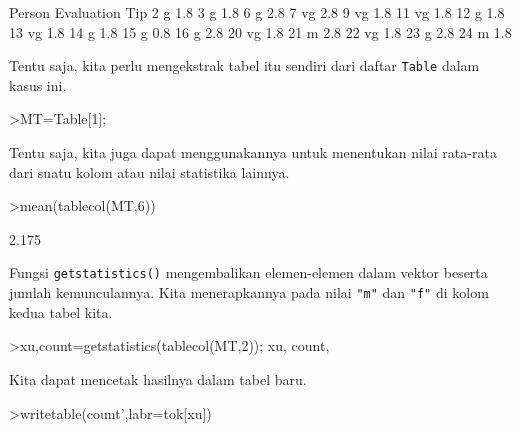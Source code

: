 \documentclass[a4paper,11pt,oneside,enabledeprecatedfontcommands]{scrbook}
\newenvironment{eulernotebook}{}{}
\newenvironment{eulercomment}{\par\medskip\noindent}{\par\medskip}
\begin{document}
\begin{eulernotebook}
		\begin{euleroutput}
			    Person Evaluation       Tip
			         2          g       1.8
			         3          g       1.8
			         6          g       2.8
			         7         vg       2.8
			         9         vg       1.8
			        11         vg       1.8
			        12          g       1.8
			        13         vg       1.8
			        14          g       1.8
			        15          g       0.8
			        16          g       2.8
			        20         vg       1.8
			        21          m       2.8
			        22         vg       1.8
			        23          g       2.8
			        24          m       1.8
		\end{euleroutput}
		\begin{eulercomment}
			Tentu saja, kita perlu mengekstrak tabel itu sendiri dari daftar \texttt{Table} dalam kasus ini.
		\end{eulercomment}
		\begin{eulerprompt}
			>MT=Table[1];
		\end{eulerprompt}
		\begin{eulercomment}
			Tentu saja, kita juga dapat menggunakannya untuk menentukan nilai rata-rata dari suatu kolom atau
			nilai statistika lainnya.
		\end{eulercomment}
		\begin{eulerprompt}
			>mean(tablecol(MT,6))
		\end{eulerprompt}
		\begin{euleroutput}
			2.175
		\end{euleroutput}
		\begin{eulercomment}
			Fungsi \texttt{getstatistics()} mengembalikan elemen-elemen dalam vektor beserta jumlah kemunculannya. Kita
			menerapkannya pada nilai \texttt{"m"} dan \texttt{"f"} di kolom kedua tabel kita.
		\end{eulercomment}
		\begin{eulerprompt}
			>{xu,count}=getstatistics(tablecol(MT,2)); xu, count,
		\end{eulerprompt}
		\begin{euleroutput}
			[1,  3]
			[12,  13]
		\end{euleroutput}
		\begin{eulercomment}
			Kita dapat mencetak hasilnya dalam tabel baru.
		\end{eulercomment}
		\begin{eulerprompt}
			>writetable(count',labr=tok[xu])
		\end{eulerprompt}
		\begin{euleroutput}

\end{euleroutput}
\end{eulernotebook}
\end{document}
